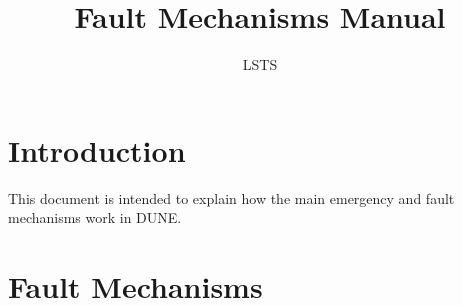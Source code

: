 \documentclass[a4paper]{scrreprt}
\begin{document}
\title{Fault Mechanisms Manual}

\author{LSTS}%


\maketitle

\setcounter{tocdepth}{1}
\tableofcontents

\chapter{Introduction}
This document is intended to explain how the main emergency and fault mechanisms work in DUNE.

\chapter{Fault Mechanisms}

\footnotesize

\newcommand{\firstcolsize}{4cm}
\newcommand{\lastcolsize}{10cm}
\newcommand{\beginconfigtable}{\begin{tabular}{|p{\firstcolsize} | l | l | p{\lastcolsize}|}}
  \newcommand{\tableheader}{\rowcolor[gray]{0.8}{\bf{Parameter Name}} & \bf{Acronym} & \bf{Default} & \bf{Description} \\}
  \newcommand{\secnameConfig}{Configuration}
  \newcommand{\secnameDescription}{Description}
  \newcommand{\secnameFlowchart}{Flowchart}








% 
% 
\end{document}
